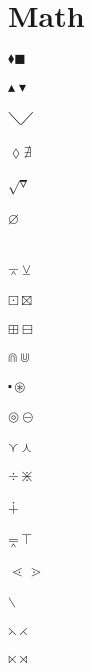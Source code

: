 \documentclass{article}
\begin{document}
\section{Math}
$\blacklozenge \blacksquare $\\\\
$\blacktriangle \blacktriangledown $\\\\
$\diagdown \diagup $\\\\
$\lozenge \nexists $\\\\
$\surd \triangledown$\\\\
$\varnothing $\\\\      
\\
$\barwedge \veebar $\\\\
$\boxdot \boxtimes $\\\\
$\boxplus \boxminus $\\\\
$\Cap \Cup $\\\\
$\centerdot \circledast $\\\\
$\circledcirc \circleddash $\\\\
$\curlyvee \curlywedge $\\\\
$\div \divideontimes $\\\\
$\dotplus$\\\\
$\doublebarwedge \intercal$\\\\ 
$\lessdot \gtrdot $\\\\
$\smallsetminus$\\\\
$\leftthreetimes \rightthreetimes $\\\\
$\ltimes \rtimes $\\\\
\end{document}
